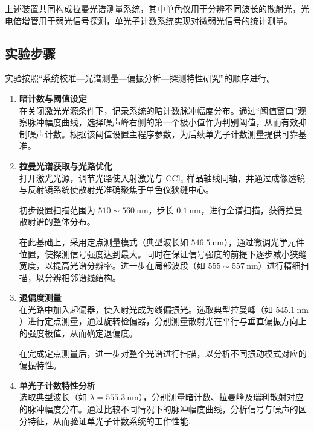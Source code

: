 \documentclass[a4paper]{ctexart}
\begin{document}
            上述装置共同构成拉曼光谱测量系统，其中单色仪用于分辨不同波长的散射光，光电倍增管用于弱光信号探测，单光子计数系统实现对微弱光信号的统计测量。

        \subsection{实验步骤}

            实验按照“系统校准—光谱测量—偏振分析—探测特性研究”的顺序进行。

            \begin{enumerate}

                \item \textbf{暗计数与阈值设定} \\
                在关闭激光光源条件下，记录系统的暗计数脉冲幅度分布。通过“阈值窗口”观察脉冲幅度曲线，选择噪声峰右侧的第一个极小值作为判别阈值，从而有效抑制噪声计数。根据该阈值设置主程序参数，为后续单光子计数测量提供可靠基准。

                \item \textbf{拉曼光谱获取与光路优化} \\
                打开激光光源，调节光路使入射激光与 CCl$_4$ 样品轴线同轴，并通过成像透镜与反射镜系统使散射光准确聚焦于单色仪狭缝中心。

                初步设置扫描范围为 $510\sim560\ \mathrm{nm}$，步长 $0.1\ \mathrm{nm}$，进行全谱扫描，获得拉曼散射谱的整体分布。

                在此基础上，采用定点测量模式（典型波长如 $546.5\ \mathrm{nm}$），通过微调光学元件位置，使探测信号强度达到最大。同时在保证信号强度的前提下逐步减小狭缝宽度，以提高光谱分辨率。进一步在局部波段（如 $555\sim557\ \mathrm{nm}$）进行精细扫描，以分辨相邻谱线结构。

                \item \textbf{退偏度测量} \\
                在光路中加入起偏器，使入射光成为线偏振光。选取典型拉曼峰（如 $545.1\ \mathrm{nm}$）进行定点测量，通过旋转检偏器，分别测量散射光在平行与垂直偏振方向上的强度极值，从而确定退偏度。

                在完成定点测量后，进一步对整个光谱进行扫描，以分析不同振动模式对应的偏振特性。

                \item \textbf{单光子计数特性分析} \\
                选取典型波长（如 $\lambda = 555.3\ \mathrm{nm}$），分别测量暗计数、拉曼峰及瑞利散射对应的脉冲幅度分布。通过比较不同情况下的脉冲幅度曲线，分析信号与噪声的区分特征，从而验证单光子计数系统的工作性能.

            \end{enumerate}
\end{document}
